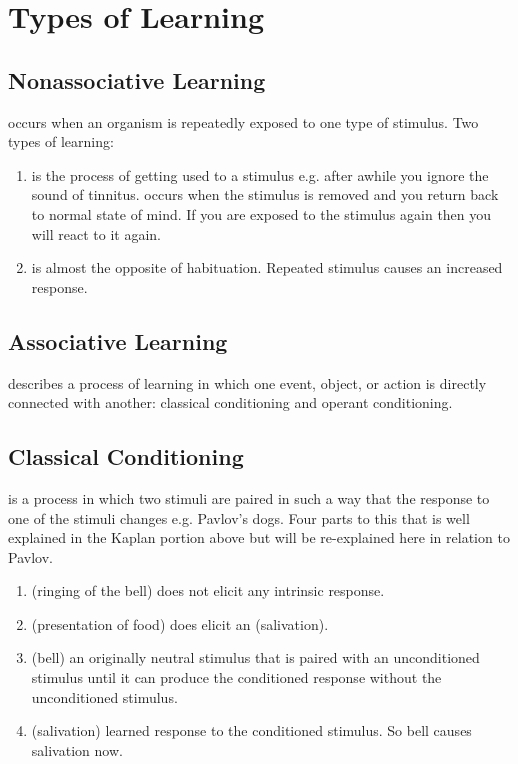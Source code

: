 \documentclass[../Psych_Soci_review.tex]{subfiles}
\begin{document}
\setcounter{section}{0}

\section{Types of Learning}
\subsection{Nonassociative Learning}
 occurs when an organism is repeatedly exposed
to one type of stimulus. Two types of learning:
\begin{enumerate}
  \item {} is the process of getting used to a stimulus e.g.
    after awhile you ignore the sound of tinnitus. 
    occurs when the stimulus is removed and you return back to normal state of
    mind. If you are exposed to the stimulus again then you will react to it
    again.
  \item {} is almost the opposite of habituation. Repeated
    stimulus causes an increased response.
\end{enumerate}

\subsection{Associative Learning}
 describes a process of learning in which one
event, object, or action is directly connected with another: classical
conditioning and operant conditioning.

\subsection{Classical Conditioning}
 is a process in which two stimuli are paired in
such a way that the response to one of the stimuli changes e.g. Pavlov's dogs.
Four parts to this that is well explained in the Kaplan portion above but will
be re-explained here in relation to Pavlov.
\begin{enumerate}
  \item {} (ringing of the bell) does not elicit any
    intrinsic response.
  \item {} (presentation of food) does elicit an
     (salivation).
  \item {} (bell) an originally neutral stimulus
    that is paired with an unconditioned stimulus until it can produce the
    conditioned response without the unconditioned stimulus.
  \item {} (salivation) learned response to the
    conditioned stimulus. So bell causes salivation now.
\end{enumerate}
\end{document}
